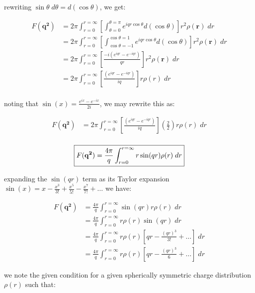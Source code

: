 \documentclass[11pt]{article}
\theoremstyle{definition}
\begin{document}
rewriting $\sin\theta\; d\theta = d(\cos\theta)$, we get:

\begin{align}
    F (\mathbf{q^2}) &= 2\pi \int_{r=0}^{r=\infty} \left[\int_{\theta=0}^{\theta=\pi} e^{iqr\cos\theta} d(\cos\theta) \right] r^2 \rho(\mathbf{r}) \; dr\\
    &= 2\pi \int_{r=0}^{r=\infty} \left[\int_{\cos\theta=-1}^{\cos\theta=1} e^{iqr\cos\theta} d(\cos\theta) \right] r^2 \rho(\mathbf{r}) \; dr\\
    &= 2\pi \int_{r=0}^{r=\infty} 
    \left[ \frac{-i\left(e^{iqr}-e^{-iqr}\right)}{qr} \right] r^2 \rho(\mathbf{r}) \; dr\\
    &= 2\pi \int_{r=0}^{r=\infty} 
    \left[ \frac{\left(e^{iqr}-e^{-iqr}\right)}{iq} \right] r \rho(r) \; dr\\
\end{align}

noting that $\sin(x) = \frac{e^{ix}-e^{-ix}}{2i}$, we may rewrite this as:

\begin{align}
    F (\mathbf{q^2}) &= 2\pi \int_{r=0}^{r=\infty} 
    \left[ \frac{\left(e^{iqr}-e^{-iqr}\right)}{iq} \right] \left(\frac{2}{2}\right) r \rho(r)\; dr\\
\end{align}

\begin{equation}
\boxed{
    F (\mathbf{q^2}) = \frac{4\pi}{q} \int_{r=0}^{r=\infty} 
    r\sin(qr)   \rho(r) \; dr\\
}
\end{equation}

expanding the $\sin(qr)$ term as its Taylor expansion $\sin(x) = x - \frac{x^3}{3!} + \frac{x^5}{5!} - \frac{x^7}{7!} + \dots$ we have:

\begin{align}
    F (\mathbf{q^2}) 
    &=  \frac{4\pi}{q} \int_{r=0}^{r=\infty} 
    \sin(qr)  r \rho(r)  \; dr\\
    &= \frac{4\pi}{q} \int_{r=0}^{r=\infty} 
    r \rho(r) \sin(qr) \; dr\\
    &= \frac{4\pi}{q} \int_{r=0}^{r=\infty} 
    r \rho(r) \left[qr - \frac{(qr)^3}{3!} + \dots \right] \; dr\\
    &= \frac{4\pi}{q} \int_{r=0}^{r=\infty} 
    r \rho(r) \left[qr - \frac{(qr)^3}{6} + \dots \right] \; dr
\end{align}

we note the given condition for a given spherically symmetric charge distribution $\rho(r)$ such that:
\end{document}
